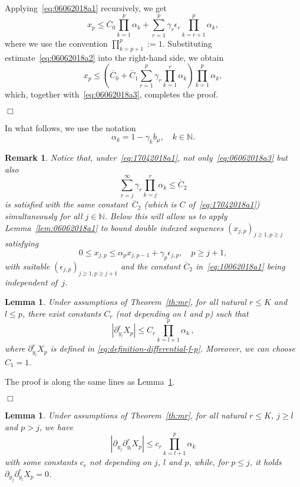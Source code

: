 \documentclass[aap,preprint]{imsart}
\newcommand{\proofendsign}{$\Box$}
\newtheorem{lem}[thm]{Lemma}
\newtheorem{remark}{Remark}
\newenvironment{proof}{{\noindent \bf Proof }}
 {{\hspace*{\fill}\proofendsign\par\bigskip}}
\newcommand*{\ol}{\overline}
\begin{document}
\begin{proof}
Applying~\eqref{eq:06062018a1} recursively, we get
$$
x_p\le\ol C_0\prod_{k=1}^p \alpha_k
+\sum_{r=1}^p \gamma_r\epsilon_r
\prod_{k=r+1}^p \alpha_k,
$$
where we use the convention $\prod_{k=p+1}^p:=1$.
Substituting estimate~\eqref{eq:06062018a2}
into the right-hand side, we obtain
$$
x_p\le\left(\ol C_0+\ol C_1
\sum_{r=1}^p \gamma_r \prod_{k=1}^r \alpha_k
\right)
\prod_{k=1}^p \alpha_k,
$$
which, together with~\eqref{eq:06062018a3}, completes the proof.
\end{proof}

In what follows, we use the notation
\begin{equation}
\label{eq:definition-alpha}
\alpha_k=1-\gamma_k b_\mu,\quad k\in\mathbb N.
\end{equation}

\begin{remark}\label{rem:10062018a1}
Notice that, under~\eqref{eq:17042018a1},
not only~\eqref{eq:06062018a3} but also
\begin{equation}\label{eq:10062018a1}
\sum_{r=j}^\infty\gamma_r \prod_{k=j}^r \alpha_k\le\ol C_2
\end{equation}
is satisfied with the same constant~$\ol C_2$
(which is $C$ of~\eqref{eq:17042018a1})
simultaneously for all $j\in\mathbb N$.
Below this will allow us to apply
Lemma~\ref{lem:06062018a1}
to bound double indexed sequences
$(x_{j,p})_{j\ge1,p\ge j}$
satisfying
$$
0\le x_{j,p}\le\alpha_p x_{j,p-1}+\gamma_p \epsilon_{j,p},\quad p\ge j+1,
$$
with suitable $(\epsilon_{j,p})_{j\ge1,p\ge j+1}$
and the constant $\ol C_2$ in~\eqref{eq:10062018a1}
being independent of~$j$.
\end{remark}

\begin{lem}\label{lem:06062018a2}
Under assumptions of Theorem~\ref{th:mr},
for all natural $r\le K$ and $l\le p$, there exist constants $C_r$ (not depending on $l$ and $p$) such that
\begin{equation}
\label{eq:08062018b2}
\left|\partial_{y_l}^r X_p \right| \le C_r\prod_{k=l+1}^p \alpha_k \,,
\end{equation}
where $\partial_{y_l}^r X_p$ is defined in \eqref{eq:definition-differential-f-p}. Moreover, we can choose $C_1=1$.
\end{lem}
\begin{proof}
The proof is along the same lines as Lemma~\ref{lem:06062018a3}.
\end{proof}
\begin{lem}\label{lem:06062018a3}
Under assumptions of Theorem~\ref{th:mr},
for all natural $r\le K$, $j\ge l$ and $p>j$, we have
\begin{equation}\label{eq:08062018b3}
\left|\partial_{y_j} \partial_{y_l}^r X_p\right|
\le c_r\prod_{k=l+1}^p \alpha_k
\end{equation}
with some constants $c_r$
not depending on $j$, $l$ and $p$,
while, for $p\le j$, it holds
$\partial_{y_{j}}\partial_{y_{l}}^{r}X_{p}=0$.
\end{lem}
\end{document}
